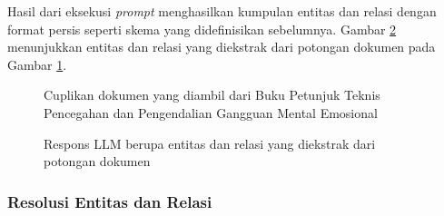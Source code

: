 Hasil dari eksekusi \textit{prompt} menghasilkan kumpulan entitas dan relasi dengan format persis seperti skema yang didefinisikan sebelumnya.
Gambar \ref{fig:entity-relation-response} menunjukkan entitas dan relasi yang diekstrak dari potongan dokumen pada Gambar \ref{fig:document-mini-chunk-example}.
\begin{figure}[H]
	\centering
	\caption{
		Cuplikan dokumen yang diambil dari Buku Petunjuk Teknis Pencegahan dan Pengendalian Gangguan Mental Emosional
	}
	\label{fig:document-mini-chunk-example}
\end{figure}

\begin{figure}[H]
	\centering
	\caption{
		Respons LLM berupa entitas dan relasi yang diekstrak dari potongan dokumen
	}
	\label{fig:entity-relation-response}
\end{figure}

\subsubsection{Resolusi Entitas dan Relasi}

